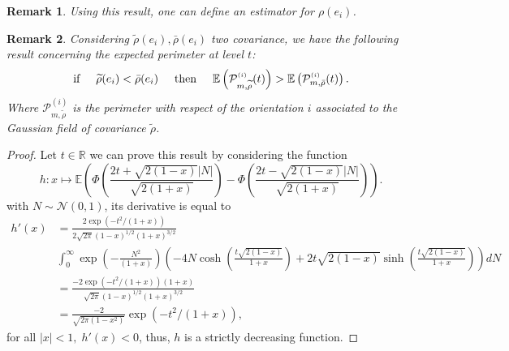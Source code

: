 \documentclass[12pt]{article}
\renewcommand{\tilde}{\widetilde}
\theoremstyle{Theorem}
\newtheorem{remark}{Remark}
\begin{document}
\begin{remark}
Using this result, one can define an estimator for $\rho(e_i)$. 
\end{remark}
\begin{remark}
Considering $\tilde{\rho}(e_i), \bar{\rho}(e_i)$ two covariance, we  have the following result concerning the expected perimeter at level $t$:
\begin{equation*}
 \text{if} \hspace{0.5cm} \tilde{\rho}(e_i) < \bar{\rho}(e_i) \hspace{0.5cm} \text{then} \hspace{0.5cm}\mathbb{E}\left(\mathcal{P}^{\scriptscriptstyle (i)}_{m, \tilde{\rho}}(t)\right) > \mathbb{E}\left(\mathcal{P}^{\scriptscriptstyle (i)}_{m, \bar{\rho}}(t)\right).
\end{equation*}
Where $\mathcal{P}^{\scriptscriptstyle (i)}_{m, \tilde{\rho}}$ is the perimeter with respect of the orientation $i$ associated to the Gaussian field of covariance $\tilde{\rho}$. 
\end{remark}
\begin{proof}
Let $t \in \mathbb{R}$ we can prove this result by considering  the function $$h:x\mapsto \mathbb{E}\left(\Phi\left(\dfrac{2t + \sqrt{2(1-x)}|N|}{\sqrt{2(1+x)}}\right) - \Phi\left(\dfrac{2t - \sqrt{2(1-x)}|N|}{\sqrt{2(1+x)}}\right)\right).
$$
with $N \sim \mathcal{N}\left(0,1\right)$, its derivative is equal to 
\begin{align*}
h'(x) &= \frac{2\exp(-t^2/(1+x))}{2\sqrt{2\pi}(1-x)^{1/2}(1+x)^{3/2}}\\
& \int_{0}^{\infty}\exp\left(-\frac{N^{2}}{(1+x)}\right)\left(-4N\cosh\left(\frac{t\sqrt{2(1-x)}}{1+x}\right) + 2t\sqrt{2(1-x)}\sinh\left( \frac{t\sqrt{2(1-x)}}{1+x}\right)\right)dN \\
& = \frac{-2\exp(-t^2/(1+x))(1+x)}{\sqrt{2\pi}(1-x)^{1/2}(1+x)^{3/2}}\\
& = \frac{-2}{\sqrt{2\pi(1-x^2)}}\exp(-t^2/(1+x)),
\end{align*}
for all $|x| < 1, \; h'(x) < 0$, thus, $h$ is a strictly decreasing function. 
\end{proof}
\end{document}
